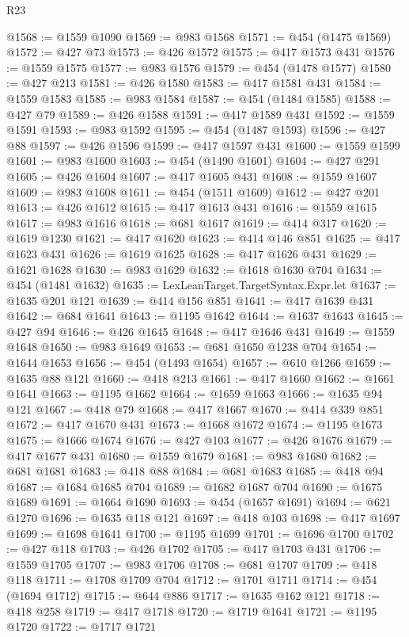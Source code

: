 \begin{lexlean}{R23}
\begin{coremodule}
@1568 := @1559 @1090
@1569 := @983 @1568
@1571 := @454 (@1475 @1569)
@1572 := @427 @73
@1573 := @426 @1572
@1575 := @417 @1573 @431
@1576 := @1559 @1575
@1577 := @983 @1576
@1579 := @454 (@1478 @1577)
@1580 := @427 @213
@1581 := @426 @1580
@1583 := @417 @1581 @431
@1584 := @1559 @1583
@1585 := @983 @1584
@1587 := @454 (@1484 @1585)
@1588 := @427 @79
@1589 := @426 @1588
@1591 := @417 @1589 @431
@1592 := @1559 @1591
@1593 := @983 @1592
@1595 := @454 (@1487 @1593)
@1596 := @427 @88
@1597 := @426 @1596
@1599 := @417 @1597 @431
@1600 := @1559 @1599
@1601 := @983 @1600
@1603 := @454 (@1490 @1601)
@1604 := @427 @291
@1605 := @426 @1604
@1607 := @417 @1605 @431
@1608 := @1559 @1607
@1609 := @983 @1608
@1611 := @454 (@1511 @1609)
@1612 := @427 @201
@1613 := @426 @1612
@1615 := @417 @1613 @431
@1616 := @1559 @1615
@1617 := @983 @1616
@1618 := @681 @1617
@1619 := @414 @317
@1620 := @1619 @1230
@1621 := @417 @1620
@1623 := @414 @146 @851
@1625 := @417 @1623 @431
@1626 := @1619 @1625
@1628 := @417 @1626 @431
@1629 := @1621 @1628
@1630 := @983 @1629
@1632 := @1618 @1630 @704
@1634 := @454 (@1481 @1632)
@1635 := LexLeanTarget.TargetSyntax.Expr.let
@1637 := @1635 @201 @121
@1639 := @414 @156 @851
@1641 := @417 @1639 @431
@1642 := @684 @1641
@1643 := @1195 @1642
@1644 := @1637 @1643
@1645 := @427 @94
@1646 := @426 @1645
@1648 := @417 @1646 @431
@1649 := @1559 @1648
@1650 := @983 @1649
@1653 := @681 @1650 @1238 @704
@1654 := @1644 @1653
@1656 := @454 (@1493 @1654)
@1657 := @610 @1266
@1659 := @1635 @88 @121
@1660 := @418 @213
@1661 := @417 @1660
@1662 := @1661 @1641
@1663 := @1195 @1662
@1664 := @1659 @1663
@1666 := @1635 @94 @121
@1667 := @418 @79
@1668 := @417 @1667
@1670 := @414 @339 @851
@1672 := @417 @1670 @431
@1673 := @1668 @1672
@1674 := @1195 @1673
@1675 := @1666 @1674
@1676 := @427 @103
@1677 := @426 @1676
@1679 := @417 @1677 @431
@1680 := @1559 @1679
@1681 := @983 @1680
@1682 := @681 @1681
@1683 := @418 @88
@1684 := @681 @1683
@1685 := @418 @94
@1687 := @1684 @1685 @704
@1689 := @1682 @1687 @704
@1690 := @1675 @1689
@1691 := @1664 @1690
@1693 := @454 (@1657 @1691)
@1694 := @621 @1270
@1696 := @1635 @118 @121
@1697 := @418 @103
@1698 := @417 @1697
@1699 := @1698 @1641
@1700 := @1195 @1699
@1701 := @1696 @1700
@1702 := @427 @118
@1703 := @426 @1702
@1705 := @417 @1703 @431
@1706 := @1559 @1705
@1707 := @983 @1706
@1708 := @681 @1707
@1709 := @418 @118
@1711 := @1708 @1709 @704
@1712 := @1701 @1711
@1714 := @454 (@1694 @1712)
@1715 := @644 @886
@1717 := @1635 @162 @121
@1718 := @418 @258
@1719 := @417 @1718
@1720 := @1719 @1641
@1721 := @1195 @1720
@1722 := @1717 @1721

\end{coremodule}
\end{lexlean}

